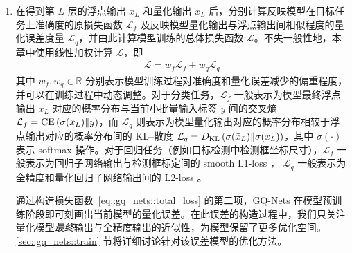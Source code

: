 \begin{enumerate}[1.]
  \item 在得到第 $L$ 层的浮点输出 $x_L$ 和量化输出 $\tilde{x}_L$ 后，分别计算反映模型在目标任务上准确度的原损失函数 $\mathcal{L}_f$ 及反映模型量化输出与浮点输出间相似程度的量化误差度量 $\mathcal{L}_q$，并由此计算模型训练的总体损失函数 $\mathcal{L}$。不失一般性地，本章中使用线性加权计算 $\mathcal{L}$，即
  \begin{align}
    \mathcal{L} = w_f \mathcal{L}_f + w_q \mathcal{L}_q \label{eq::gq_nets::total_loss}
  \end{align}
  其中 $w_f, w_q \in \mathbb{R}$ 分别表示模型训练过程对准确度和量化误差减少的偏重程度，并可以在训练过程中动态调整。对于分类任务，$\mathcal{L}_f$ 一般表示为模型最终浮点输出 $x_L$ 对应的概率分布与当前小批量输入标签 $y$ 间的交叉熵 $\mathcal{L}_f = \mathrm{CE}\left( \sigma(x_L) \| y \right)$，而 $\mathcal{L}_q$ 则表示为模型量化输出对应的概率分布相较于浮点输出对应的概率分布间的 KL--散度 $\mathcal{L}_q = D_{\mathrm{KL}}\left( \sigma(\tilde{x}_L) \| \sigma(x_L) \right)$，其中 $\sigma(\cdot)$ 表示 softmax 操作。对于回归任务（例如目标检测中检测框坐标尺寸），$\mathcal{L}_f$ 一般表示为回归子网络输出与检测框标定间的 smooth L1-loss ， $\mathcal{L}_q$ 一般表示为全精度和量化回归子网络输出间的 L2-loss 。
  
  通过构造损失函数~\eqref{eq::gq_nets::total_loss} 的第二项，GQ-Nets 在模型预训练阶段即可刻画出当前模型的量化误差。在此误差的构造过程中，我们只关注量化模型\emph{最终}输出与全精度输出的近似性，为模型保留了更多优化空间。\ref{sec::gq_nets::train} 节将详细讨论针对该误差模型的优化方法。
\end{enumerate}

